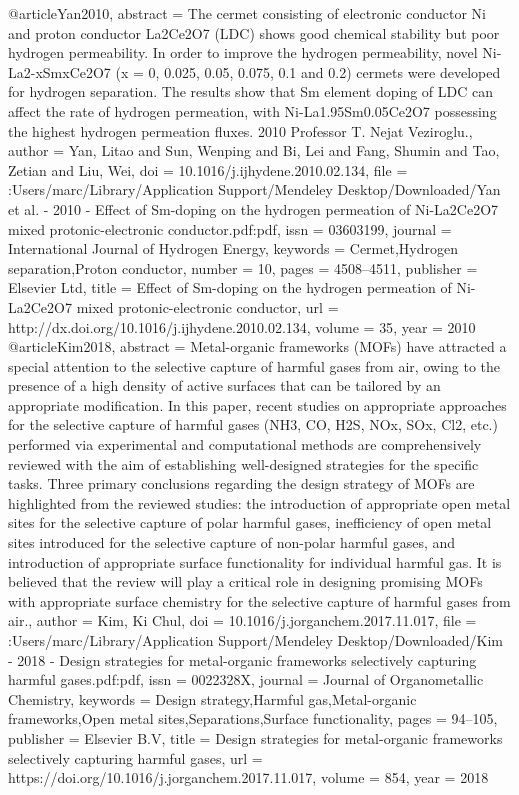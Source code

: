 @article{Yan2010,
abstract = {The cermet consisting of electronic conductor Ni and proton conductor La2Ce2O7 (LDC) shows good chemical stability but poor hydrogen permeability. In order to improve the hydrogen permeability, novel Ni-La2-xSmxCe2O7 (x = 0, 0.025, 0.05, 0.075, 0.1 and 0.2) cermets were developed for hydrogen separation. The results show that Sm element doping of LDC can affect the rate of hydrogen permeation, with Ni-La1.95Sm0.05Ce2O7 possessing the highest hydrogen permeation fluxes. {\textcopyright} 2010 Professor T. Nejat Veziroglu.},
author = {Yan, Litao and Sun, Wenping and Bi, Lei and Fang, Shumin and Tao, Zetian and Liu, Wei},
doi = {10.1016/j.ijhydene.2010.02.134},
file = {:Users/marc/Library/Application Support/Mendeley Desktop/Downloaded/Yan et al. - 2010 - Effect of Sm-doping on the hydrogen permeation of Ni-La2Ce2O7 mixed protonic-electronic conductor.pdf:pdf},
issn = {03603199},
journal = {International Journal of Hydrogen Energy},
keywords = {Cermet,Hydrogen separation,Proton conductor},
number = {10},
pages = {4508--4511},
publisher = {Elsevier Ltd},
title = {{Effect of Sm-doping on the hydrogen permeation of Ni-La2Ce2O7 mixed protonic-electronic conductor}},
url = {http://dx.doi.org/10.1016/j.ijhydene.2010.02.134},
volume = {35},
year = {2010}
}
@article{Kim2018,
abstract = {Metal-organic frameworks (MOFs) have attracted a special attention to the selective capture of harmful gases from air, owing to the presence of a high density of active surfaces that can be tailored by an appropriate modification. In this paper, recent studies on appropriate approaches for the selective capture of harmful gases (NH3, CO, H2S, NOx, SOx, Cl2, etc.) performed via experimental and computational methods are comprehensively reviewed with the aim of establishing well-designed strategies for the specific tasks. Three primary conclusions regarding the design strategy of MOFs are highlighted from the reviewed studies: the introduction of appropriate open metal sites for the selective capture of polar harmful gases, inefficiency of open metal sites introduced for the selective capture of non-polar harmful gases, and introduction of appropriate surface functionality for individual harmful gas. It is believed that the review will play a critical role in designing promising MOFs with appropriate surface chemistry for the selective capture of harmful gases from air.},
author = {Kim, Ki Chul},
doi = {10.1016/j.jorganchem.2017.11.017},
file = {:Users/marc/Library/Application Support/Mendeley Desktop/Downloaded/Kim - 2018 - Design strategies for metal-organic frameworks selectively capturing harmful gases.pdf:pdf},
issn = {0022328X},
journal = {Journal of Organometallic Chemistry},
keywords = {Design strategy,Harmful gas,Metal-organic frameworks,Open metal sites,Separations,Surface functionality},
pages = {94--105},
publisher = {Elsevier B.V},
title = {{Design strategies for metal-organic frameworks selectively capturing harmful gases}},
url = {https://doi.org/10.1016/j.jorganchem.2017.11.017},
volume = {854},
year = {2018}
}
